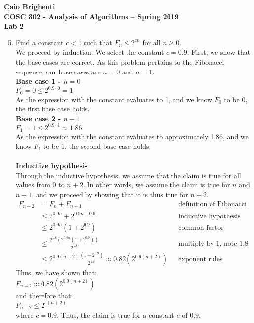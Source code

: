 \documentclass{article}
\begin{document}
\noindent \textbf{Caio Brighenti }\\
\noindent \textbf{COSC 302 - Analysis of Algorithms -- Spring 2019}\\%
\noindent \textbf{Lab 2}\vspace{1em}\\
\begin{enumerate}
\setcounter{enumi}{4}
\item Find a constant $c<1$ such that $F_n \leq 2^{cn}$ for all $n\geq 0$.
\\ We proceed by induction. We select the constant $c=0.9$. First, we show that the base cases are correct. As this problem pertains to the Fibonacci sequence, our base cases are $n=0$ and $n=1$. 
\\ \textbf{Base case 1 - $n=0$}\\
$F_0=0\leq 2^{0.9\cdot0}=1$ \\
As the expression with the constant evaluates to 1, and we know $F_0$ to be 0, the first base case holds.
\\ \textbf{Base case 2 - $n-1$}\\
$F_1=1\leq 2^{0.9\cdot1}\approx1.86$ \\
As the expression with the constant evaluates to approximately 1.86, and we know $F_1$ to be 1, the second base case holds.
\\
\\ \textbf{Inductive hypothesis}
\\ Through the inductive hypothesis, we assume that the claim is true for all values from $0$ to $n+2$. In other words, we assume the claim is true for $n$ and $n+1$, and we proceed by showing that it is thus true for $n+2$.
\begin{align}
	F_{n+2}&=F_{n}+F_{n+1} && \text{definition of Fibonacci} \\
	&\leq 2^{0.9n}+2^{0.9n+0.9} && \text{inductive hypothesis} \\
	&\leq 2^{0.9n}(1+2^{0.9}) && \text{common factor} \\
	&\leq \frac{2^{1.8}(2^{0.9n}(1+2^{0.9}))}{2^{1.8}} && \text{multiply by 1, note 1.8 = 2c} \\
	&\leq 2^{0.9(n+2)}\frac{(1+2^{0.9})}{2^1.8}\approx 0.82(2^{0.9(n+2)}) && \text{exponent rules}	
\end{align}
Thus, we have shown that: \\
$F_{n+2}\approx 0.82(2^{0.9(n+2)})$ \\
and therefore that: \\
$F_{n+2}\leq2^{c(n+2)}$ \\
where $c=0.9$. Thus, the claim is true for a constant $c$ of $0.9$.
\end{enumerate}
\end{document}

